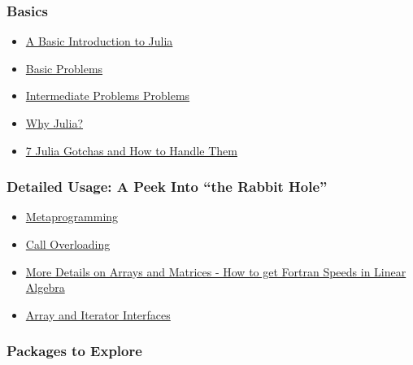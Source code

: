 \documentclass[11pt]{article}
\begin{document}
\subsubsection{Basics}\label{basics}

\begin{itemize}
\itemsep1pt\parskip0pt
\item
  \href{http://ucidatascienceinitiative.github.io/IntroToJulia/Html/BasicIntroduction}{A
  Basic Introduction to Julia}
\item
  \href{http://ucidatascienceinitiative.github.io/IntroToJulia/Html/BasicProblems}{Basic
  Problems}
\item
  \href{http://ucidatascienceinitiative.github.io/IntroToJulia/Html/BasicProblems}{Intermediate
  Problems Problems}
\item
  \href{http://ucidatascienceinitiative.github.io/IntroToJulia/Html/WhyJulia}{Why
  Julia?}
\item
  \href{http://www.stochasticlifestyle.com/7-julia-gotchas-handle/}{7
  Julia Gotchas and How to Handle Them}
\end{itemize}

\subsubsection{Detailed Usage: A Peek Into ``the Rabbit
Hole''}\label{detailed-usage-a-peek-into-the-rabbit-hole}

\begin{itemize}
\itemsep1pt\parskip0pt
\item
  \href{http://ucidatascienceinitiative.github.io/IntroToJulia/Html/Metaprogramming}{Metaprogramming}
\item
  \href{http://ucidatascienceinitiative.github.io/IntroToJulia/Html/CallOverloading}{Call
  Overloading}
\item
  \href{http://ucidatascienceinitiative.github.io/IntroToJulia/Html/ArraysAndMatrices}{More
  Details on Arrays and Matrices - How to get Fortran Speeds in Linear
  Algebra}
\item
  \href{http://ucidatascienceinitiative.github.io/IntroToJulia/Html/ArrayIteratorInterfaces}{Array
  and Iterator Interfaces}
\end{itemize}

\subsubsection{Packages to Explore}\label{packages-to-explore}
\end{document}
